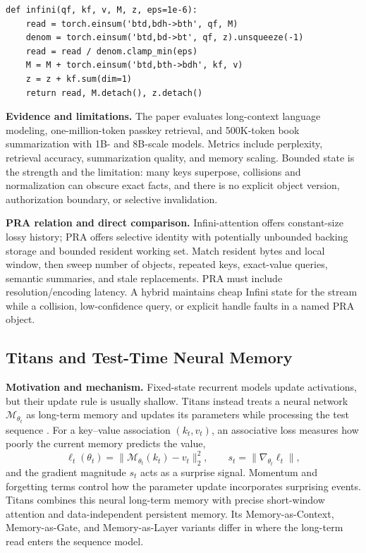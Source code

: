 \begin{lstlisting}[caption={Associative-memory read and write}]
def infini(qf, kf, v, M, z, eps=1e-6):
    read = torch.einsum('btd,bdh->bth', qf, M)
    denom = torch.einsum('btd,bd->bt', qf, z).unsqueeze(-1)
    read = read / denom.clamp_min(eps)
    M = M + torch.einsum('btd,bth->bdh', kf, v)
    z = z + kf.sum(dim=1)
    return read, M.detach(), z.detach()
\end{lstlisting}

\textbf{Evidence and limitations.} The paper evaluates long-context language modeling,
one-million-token passkey retrieval, and 500K-token book summarization with 1B- and 8B-scale
models.  Metrics include perplexity, retrieval accuracy, summarization quality, and memory
scaling.  Bounded state is the strength and the limitation: many keys superpose, collisions
and normalization can obscure exact facts, and there is no explicit object version,
authorization boundary, or selective invalidation.

\textbf{PRA relation and direct comparison.} Infini-attention offers constant-size lossy
history; PRA offers selective identity with potentially unbounded backing storage and
bounded resident working set.  Match resident bytes and local window, then sweep number of
objects, repeated keys, exact-value queries, semantic summaries, and stale replacements.
PRA must include resolution/encoding latency.  A hybrid maintains cheap Infini state for
the stream while a collision, low-confidence query, or explicit handle faults in a named
PRA object.

\subsection{Titans and Test-Time Neural Memory}

\textbf{Motivation and mechanism.} Fixed-state recurrent models update activations, but
their update rule is usually shallow. Titans instead treats a neural network
$\mathcal M_{\theta_t}$ as long-term memory and updates its parameters while processing the
test sequence \citep{behrouz2025titans}. For a key--value association $(k_t,v_t)$, an
associative loss measures how poorly the current memory predicts the value,
\begin{equation}
\ell_t(\theta_t)=\|\mathcal M_{\theta_t}(k_t)-v_t\|_2^2,
\qquad s_t=\|\nabla_{\theta_t}\ell_t\|,
\end{equation}
and the gradient magnitude $s_t$ acts as a surprise signal. Momentum and forgetting terms
control how the parameter update incorporates surprising events. Titans combines this
neural long-term memory with precise short-window attention and data-independent persistent
memory. Its Memory-as-Context, Memory-as-Gate, and Memory-as-Layer variants differ in where
the long-term read enters the sequence model.

